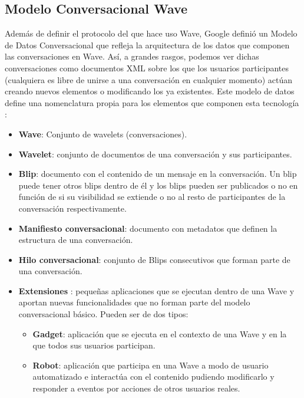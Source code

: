     \subsection{Modelo Conversacional Wave}\label{sec:waveModel}
    
    Además de definir el protocolo del que hace uso Wave, Google definió un Modelo de Datos Conversacional \cite{ref:wave_conversation_model} que refleja la arquitectura de los datos que componen las conversaciones en Wave. Así, a grandes rasgos, podemos ver dichas conversaciones como documentos XML sobre los que los usuarios participantes (cualquiera es libre de unirse a una conversación en cualquier momento) actúan creando nuevos elementos o modificando los ya existentes. Este modelo de datos define una nomenclatura propia para los elementos que componen esta tecnología \cite{ref:wave_api_overview} \cite{ref:wave_white_paper}:
    
      \begin{itemize}
	\item \textbf{Wave}: Conjunto de wavelets (conversaciones).
	\item \textbf{Wavelet}: conjunto de documentos de una conversación y sus participantes.
	\item \textbf{Blip}: documento con el contenido de un mensaje en la conversación. Un blip puede tener otros blips dentro de él y los blips pueden ser publicados o no en función de si su visibilidad se extiende o no al resto de participantes de la conversación respectivamente.
	\item \textbf{Manifiesto conversacional}: documento con metadatos que definen la estructura de una conversación. 
	\item \textbf{Hilo conversacional}: conjunto de Blips consecutivos que forman parte de una conversación.
	\item \textbf{Extensiones} \cite{ref:wave_extensions}: pequeñas aplicaciones que se ejecutan dentro de una Wave y aportan nuevas funcionalidades que no forman parte del modelo conversacional básico. Pueden ser de dos tipos:
	  \begin{itemize}
	    \item \textbf{Gadget}: aplicación que se ejecuta en el contexto de una Wave y en la que todos sus usuarios participan.
	    \item \textbf{Robot}: aplicación que participa en una Wave a modo de usuario automatizado e interactúa con el contenido pudiendo modificarlo y responder a eventos por acciones de otros usuarios reales.
	  \end{itemize}
      \end{itemize}
      

